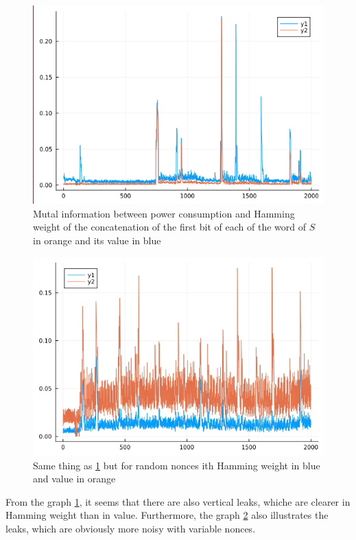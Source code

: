 \documentclass[a4paper,11pt,twocolumn]{article}
\begin{document}
		\begin{figure}[h]
			\centering
			\includegraphics[scale=0.3]{vertical_one_bit}
			\caption{Mutal information between power consumption and Hamming weight of the concatenation of the first bit of each of the word of $S$ in orange and its value in blue}
			\label{vHW}
		\end{figure}
		
		\begin{figure}[h]
			\centering
			\includegraphics[scale=0.3]{vertical_one_byte}
			\caption{Same thing as \ref{vHW} but for random nonces ith Hamming weight in blue and value in orange}
			\label{vHW&val}
		\end{figure}
		
		From the graph \ref{vHW}, it seems that there are also vertical leaks, whiche are clearer in Hamming weight than in value. Furthermore, the graph \ref{vHW&val} also illustrates the leaks, which are obviously more noisy with variable nonces.
		
\end{document}
